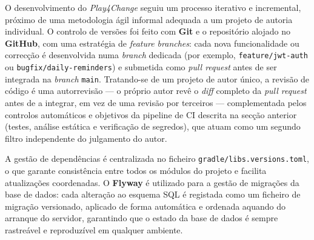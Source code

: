 O desenvolvimento do \emph{Play4Change} seguiu um processo iterativo e incremental, próximo de uma metodologia ágil informal adequada a um projeto de autoria individual. O controlo de versões foi feito com \textbf{Git} e o repositório alojado no \textbf{GitHub}, com uma estratégia de \emph{feature branches}: cada nova funcionalidade ou correcção é desenvolvida numa \emph{branch} dedicada (por exemplo, \texttt{feature/jwt-auth} ou \texttt{bugfix/daily-reminders}) e submetida como \emph{pull request} antes de ser integrada na \emph{branch} \texttt{main}. Tratando-se de um projeto de autor único, a revisão de código é uma autorrevisão --- o próprio autor revê o \emph{diff} completo da \emph{pull request} antes de a integrar, em vez de uma revisão por terceiros --- complementada pelos controlos automáticos e objetivos da pipeline de CI descrita na secção anterior (testes, análise estática e verificação de segredos), que atuam como um segundo filtro independente do julgamento do autor.

A gestão de dependências é centralizada no ficheiro \texttt{gradle/libs.versions.toml}, o que garante consistência entre todos os módulos do projeto e facilita atualizações coordenadas. O \textbf{Flyway} é utilizado para a gestão de migrações da base de dados: cada alteração ao esquema SQL é registada como um ficheiro de migração versionado, aplicado de forma automática e ordenada aquando do arranque do servidor, garantindo que o estado da base de dados é sempre rastreável e reproduzível em qualquer ambiente.
